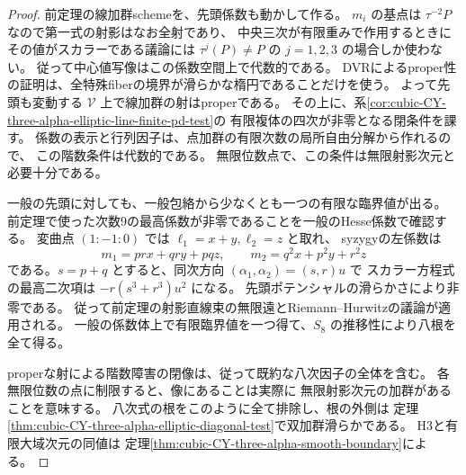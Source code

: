 \begin{proof}
前定理の線加群schemeを、先頭係数も動かして作る。
$m_i$ の基点は $\tau^{-2}P$ なので第一式の射影はなお全射であり、
中央三次が有限重みで作用するときにその値がスカラーである議論には
$\tau^j(P)\ne P$ の $j=1,2,3$ の場合しか使わない。
従って中心値写像はこの係数空間上で代数的である。
DVRによるproper性の証明は、全特殊fiberの境界が滑らかな楕円であることだけを使う。
よって先頭も変動する $\mathcal V$ 上で線加群の射はproperである。
その上に、系\ref{cor:cubic-CY-three-alpha-elliptic-line-finite-pd-test}の
有限複体の四次が非零となる閉条件を課す。
係数の表示と行列因子は、点加群の有限次数の局所自由分解から作れるので、
この階数条件は代数的である。
無限位数点で、この条件は無限射影次元と必要十分である。

一般の先頭に対しても、一般包絡から少なくとも一つの有限な臨界値が出る。
前定理で使った次数9の最高係数が非零であることを一般のHesse係数で確認する。
変曲点 $(1:-1:0)$ では $\ell_1=x+y,\ell_2=z$ と取れ、
syzygyの左係数は
\[
 m_1=prx+qry+pqz,\qquad m_2=q^2x+p^2y+r^2z
\]
である。$s=p+q$ とすると、同次方向 $(\alpha_1,\alpha_2)=(s,r)u$ で
スカラー方程式の最高二次項は $-r(s^3+r^3)u^2$ になる。
先頭ポテンシャルの滑らかさにより非零である。
従って前定理の射影直線束の無限遠とRiemann--Hurwitzの議論が適用される。
一般の係数体上で有限臨界値を一つ得て、$S_8$ の推移性により八根を全て得る。

properな射による階数障害の閉像は、従って既約な八次因子の全体を含む。
各無限位数の点に制限すると、像にあることは実際に
無限射影次元の加群があることを意味する。
八次式の根をこのように全て排除し、根の外側は
定理\ref{thm:cubic-CY-three-alpha-elliptic-diagonal-test}で双加群滑らかである。
H3と有限大域次元の同値は
定理\ref{thm:cubic-CY-three-alpha-smooth-boundary}による。
\end{proof}
